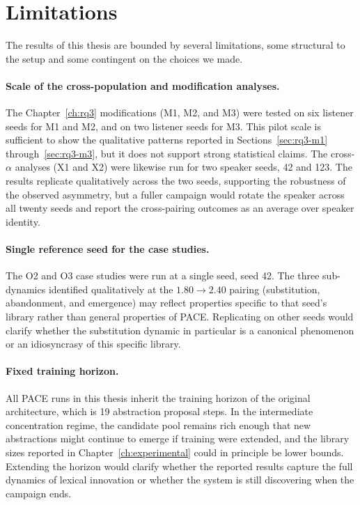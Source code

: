 \section{Limitations}
\label{sec:limitations}

The results of this thesis are bounded by several limitations, some structural to the setup and some contingent on the choices we made.

\paragraph{Scale of the cross-population and modification analyses.}
The Chapter~\ref{ch:rq3} modifications (M1, M2, and M3) were tested on six listener seeds for M1 and M2, and on two listener seeds for M3. This pilot scale is sufficient to show the qualitative patterns reported in Sections~\ref{sec:rq3-m1} through~\ref{sec:rq3-m3}, but it does not support strong statistical claims. The cross-$\alpha$ analyses (X1 and X2) were likewise run for two speaker seeds, 42 and 123. The results replicate qualitatively across the two seeds, supporting the robustness of the observed asymmetry, but a fuller campaign would rotate the speaker across all twenty seeds and report the cross-pairing outcomes as an average over speaker identity.

\paragraph{Single reference seed for the case studies.}
The O2 and O3 case studies were run at a single seed, seed 42. The three sub-dynamics identified qualitatively at the $1.80 \rightarrow 2.40$ pairing (substitution, abandonment, and emergence) may reflect properties specific to that seed's library rather than general properties of PACE. Replicating on other seeds would clarify whether the substitution dynamic in particular is a canonical phenomenon or an idiosyncrasy of this specific library.

\paragraph{Fixed training horizon.}
All PACE runs in this thesis inherit the training horizon of the original architecture, which is 19 abstraction proposal steps. In the intermediate concentration regime, the candidate pool remains rich enough that new abstractions might continue to emerge if training were extended, and the library sizes reported in Chapter~\ref{ch:experimental} could in principle be lower bounds. Extending the horizon would clarify whether the reported results capture the full dynamics of lexical innovation or whether the system is still discovering when the campaign ends.

